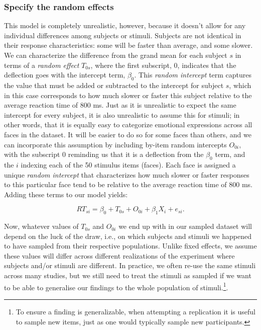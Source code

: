 \documentclass[english,doc,floatsintext]{apa6}
\begin{document}
\hypertarget{specify-the-random-effects}{%
\subsubsection{Specify the random effects}\label{specify-the-random-effects}}

This model is completely unrealistic, however, because it doesn't allow for any individual differences among subjects or stimuli. Subjects are not identical in their response characteristics: some will be faster than average, and some slower. We can characterize the difference from the grand mean for each subject \(s\) in terms of a \emph{random effect} \(T_{0s}\), where the first subscript, 0, indicates that the deflection goes with the intercept term, \(\beta_0\). This \emph{random intercept} term captures the value that must be added or subtracted to the intercept for subject \(s\), which in this case corresponds to how much slower or faster this subject relative to the average reaction time of 800 ms. Just as it is unrealistic to expect the same intercept for every subject, it is also unrealistic to assume this for stimuli; in other words, that it is equally easy to categorize emotional expressions across all faces in the dataset. It will be easier to do so for some faces than others, and we can incorporate this assumption by including by-item random intercepts \(O_{0i}\), with the subscript 0 reminding us that it is a deflection from the \(\beta_0\) term, and the \(i\) indexing each of the 50 stimulus items (faces). Each face is assigned a unique \emph{random intercept} that characterizes how much slower or faster responses to this particular face tend to be relative to the average reaction time of 800 ms. Adding these terms to our model yields:

\begin{equation}
RT_{si} = \beta_0 + T_{0s} + O_{0i} + \beta_1 X_i + e_{si} .
\end{equation}

Now, whatever values of \(T_{0s}\) and \(O_{0i}\) we end up with in our sampled dataset will depend on the luck of the draw, i.e., on which subjects and stimuli we happened to have sampled from their respective populations. Unlike fixed effects, we assume these values will differ across different realizations of the experiment where subjects and/or stimuli are different. In practice, we often re-use the same stimuli across many studies, but we still need to treat the stimuli as sampled if we want to be able to generalise our findings to the whole population of stimuli.\footnote{To ensure a finding is generalizable, when attempting a replication it is useful to sample new items, just as one would typically sample new participants.}.
\end{document}
